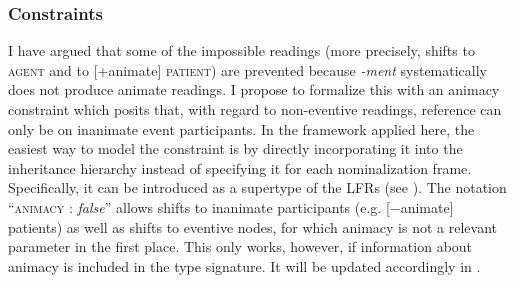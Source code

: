 \subsubsection{Constraints}
\label{sec:cos-output-formal-constr}

I have argued that some of the impossible readings (more precisely, shifts to \textsc{agent} and to [+animate] \textsc{patient}) are prevented because \mbox{\textit{-ment}} systematically does not produce animate readings. I propose to formalize this with an animacy constraint which posits that, with regard to non-eventive readings, reference can only be on inanimate event participants. 
In the framework applied here, the easiest way to model the constraint is by directly incorporating it into the inheritance hierarchy instead of specifying it for each nominalization frame. Specifically, it can be introduced as a supertype of the LFRs
(see ). The notation ``\textsc{animacy :} \textit{false}'' allows shifts to inanimate participants (e.g. [−animate] patients) as well as shifts to eventive nodes, for which animacy is not a relevant parameter in the first place. 
This only works, however, if information about animacy is included in the type signature. It will be updated accordingly in . 

